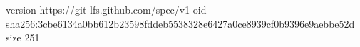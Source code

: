 version https://git-lfs.github.com/spec/v1
oid sha256:3cbe6134a0bb612b23598fddeb5538328e6427a0ce8939cf0b9396e9aebbe52d
size 251
